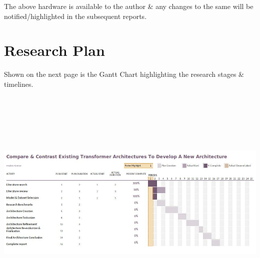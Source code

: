 \documentclass[11pt]{article}
\begin{document}
The above hardware is available to the author \& any changes to the same will be notified/highlighted in the subsequent reports.
\section{Research Plan}\label{plan}

Shown on the next page is the Gantt Chart highlighting the research stages \& timelines.\\
\includegraphics[width=180mm,height=120mm,angle=90]{g2}
\newpage


\end{document}
